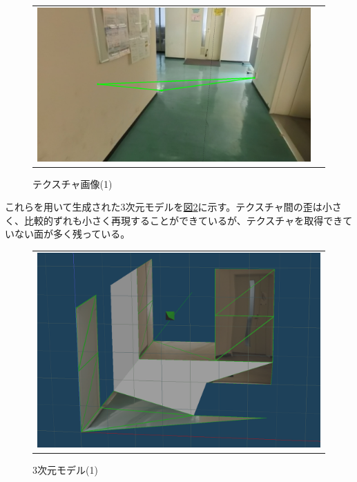 \documentclass[]{jarticle}          %
\begin{document}
\begin{figure}[H]
\begin{center}
\begin{tabular}{cc}
      \includegraphics[keepaspectratio, scale=0.1]{figures/texture1/texture/texture_1_1.png}\\
    \end{tabular}
  \end{center}
  \caption{テクスチャ画像(1)}
  \label{one}
\end{figure}

これらを用いて生成された3次元モデルを\hyperref[two]{図\ref{two}}に示す。テクスチャ間の歪は小さく、比較的ずれも小さく再現することができているが、テクスチャを取得できていない面が多く残っている。

\begin{figure}[H]
  \begin{center}
    \begin{tabular}{c}
      \includegraphics[keepaspectratio, scale=0.3]{figures/C5F1.png}
    \end{tabular}
  \end{center}
  \caption{3次元モデル(1)}
  \label{two}
\end{figure}
\end{document}
